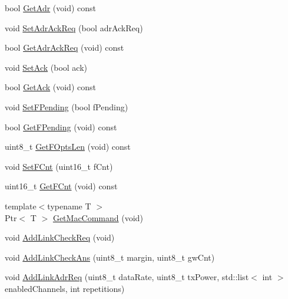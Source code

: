 \begin{DoxyCompactItemize}
\item 
bool \hyperlink{classns3_1_1lorawan_1_1LoraFrameHeader_ab0d26c72b277ac3acec6bb3805f7a2db}{Get\+Adr} (void) const
\item 
void \hyperlink{classns3_1_1lorawan_1_1LoraFrameHeader_a97022ac4ffee6dd63f1541b948460fe9}{Set\+Adr\+Ack\+Req} (bool adr\+Ack\+Req)
\item 
bool \hyperlink{classns3_1_1lorawan_1_1LoraFrameHeader_af14c6220e994d4804c84d8b0109af882}{Get\+Adr\+Ack\+Req} (void) const
\item 
void \hyperlink{classns3_1_1lorawan_1_1LoraFrameHeader_a4a7c35d0c20670d6e4471e56b51c3c8f}{Set\+Ack} (bool ack)
\item 
bool \hyperlink{classns3_1_1lorawan_1_1LoraFrameHeader_a7f0e234436440b35b450d818c5502c6a}{Get\+Ack} (void) const
\item 
void \hyperlink{classns3_1_1lorawan_1_1LoraFrameHeader_aaa9aab8d0d40206c82711b62bf0f2165}{Set\+F\+Pending} (bool f\+Pending)
\item 
bool \hyperlink{classns3_1_1lorawan_1_1LoraFrameHeader_a425e56d3f473048ba6986bd1ac716e6c}{Get\+F\+Pending} (void) const
\item 
uint8\+\_\+t \hyperlink{classns3_1_1lorawan_1_1LoraFrameHeader_af9e5cbf58842f7527fbbceba2e6818fe}{Get\+F\+Opts\+Len} (void) const
\item 
void \hyperlink{classns3_1_1lorawan_1_1LoraFrameHeader_a29821504b7f5958226cab2d92e486928}{Set\+F\+Cnt} (uint16\+\_\+t f\+Cnt)
\item 
uint16\+\_\+t \hyperlink{classns3_1_1lorawan_1_1LoraFrameHeader_aca554586ea869137a7ab1f5db6c81a1f}{Get\+F\+Cnt} (void) const
\item 
{\footnotesize template$<$typename T $>$ }\\Ptr$<$ T $>$ \hyperlink{classns3_1_1lorawan_1_1LoraFrameHeader_acdb8505e2b4f1dc3d94fd33b3213ff46}{Get\+Mac\+Command} (void)
\item 
void \hyperlink{classns3_1_1lorawan_1_1LoraFrameHeader_a685ca6cad5d37101f0e652ec183d74f6}{Add\+Link\+Check\+Req} (void)
\item 
void \hyperlink{classns3_1_1lorawan_1_1LoraFrameHeader_aaee911e70a141b512d68b6825c508f5f}{Add\+Link\+Check\+Ans} (uint8\+\_\+t margin, uint8\+\_\+t gw\+Cnt)
\item 
void \hyperlink{classns3_1_1lorawan_1_1LoraFrameHeader_accbe167e292fdcae11c28f294004fd6a}{Add\+Link\+Adr\+Req} (uint8\+\_\+t data\+Rate, uint8\+\_\+t tx\+Power, std\+::list$<$ int $>$ enabled\+Channels, int repetitions)
\item 

\end{DoxyCompactItemize}
